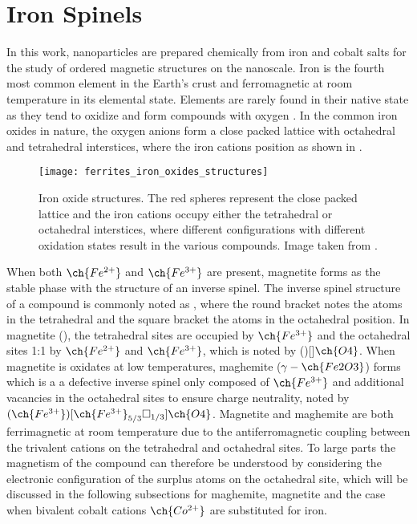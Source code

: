 \documentclass[\main/dresen_thesis.tex]{subfiles}
\begin{document}
  \section{Iron Spinels}
  In this work, nanoparticles are prepared chemically from iron and cobalt salts for the study of ordered magnetic structures on the nanoscale.
  Iron is the fourth most common element in the Earth's crust and ferromagnetic at room temperature in its elemental state.
  Elements are rarely found in their native state as they tend to oxidize and form compounds with oxygen \cite{Parkinson_2016_Irono}.
  In the common iron oxides in nature, the oxygen anions  form a close packed lattice with octahedral and tetrahedral interstices, where the iron cations position as shown in .
  \begin{figure}[b]
    \centering
    \texttt{[image: ferrites\_iron\_oxides\_structures]}
    \caption{\label{fig:theoreticalBackground:ferrites:ironOxides}Iron oxide structures. The red spheres represent the close packed  lattice and the iron cations occupy either the tetrahedral or octahedral interstices, where different configurations with different oxidation states result in the various compounds. Image taken from  \cite{Parkinson_2016_Irono}.}
  \end{figure}

  When both $\ch{Fe^{2+}}$ and $\ch{Fe^{3+}}$ are present, magnetite forms as the stable phase with the structure of an inverse spinel.
  The inverse spinel structure of a compound  is commonly noted as , where the round bracket notes the atoms in the tetrahedral and the square bracket the atoms in the octahedral position.
  In magnetite (), the tetrahedral sites are occupied by $\ch{Fe^{3+}}$ and the octahedral sites 1:1 by $\ch{Fe^{2+}}$ and $\ch{Fe^{3+}}$, which is noted by ()[]$\ch{O4}$. When magnetite is oxidates at low temperatures, maghemite ($\gamma-\ch{Fe2O3}$) forms which is a a defective inverse spinel only composed of $\ch{Fe^{3+}}$ and additional vacancies in the octahedral sites to ensure charge neutrality, noted by $(\ch{Fe^{3+}})[\ch{Fe^{3+}}_{5/3}\square_{1/3}]\ch{O4}$.
  Magnetite and maghemite are both ferrimagnetic at room temperature due to the antiferromagnetic coupling between the trivalent cations on the tetrahedral and octahedral sites.
  To large parts the magnetism of the compound can therefore be understood by considering the electronic configuration of the surplus atoms on the octahedral site, which will be discussed in the following subsections for maghemite, magnetite and the case when bivalent cobalt cations $\ch{Co^{2+}}$ are substituted for iron.
\end{document}
